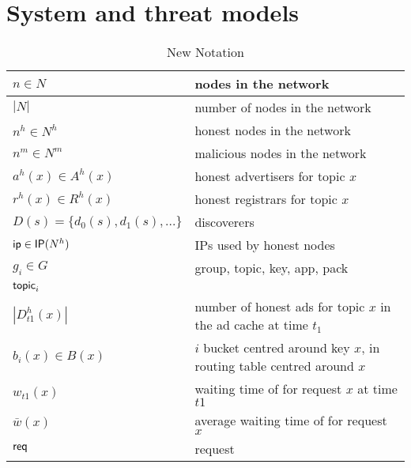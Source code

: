 
\section{System and threat models}
\label{sec:model}

% 

\begin{table*}
  \caption{New Notation}
  \label{tab:new_notation}
\begin{center}
  \begin{tabular}{ | l | p{16cm} |}
    \hline
      $n \in N$ & nodes in the network \\ \hline
      $|N|$ & number of nodes in the network \\ \hline
      $n^h \in N^h$ & honest nodes in the network \\ \hline
      $n^m \in N^m$ & malicious nodes in the network \\ \hline
      $a^h(x) \in A^h(x)$ & honest advertisers for topic $x$ \\ \hline
      $r^h(x) \in R^h(x)$ & honest registrars for topic $x$ \\ \hline
      $D(s) = \{d_0(s), d_1(s),...\}$ &  discoverers \\ \hline
      $\mathsf{ip} \in \mathsf{IP}(N^h)$ & IPs used by honest nodes \\ \hline
      $g_i \in G$  & group, topic, key, app, pack\\ \hline
      $\mathsf{topic}_i$\\ \hline
      $|D_{t1}^h(x)|$& number of honest ads for topic $x$ in the ad cache at time $t_1$ \\ \hline
      $b_i(x) \in B(x)$& $i$ bucket centred around key $x$, in routing table centred around $x$ \\ \hline
      $w_{t1}(x) $ & waiting time of for request $x$ at time $t1$ \\ \hline
      $\bar{w}(x) $ & average waiting time of for request $x$\\ \hline
      $\mathsf{req}$& request \\ \hline


\end{tabular}
\end{center}
\end{table*}
